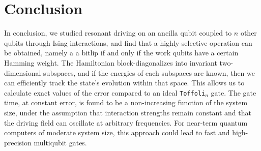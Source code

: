 \section{Conclusion}
In conclusion, we studied resonant driving on an ancilla qubit coupled to $n$ other qubits through Ising interactions, and find that a highly selective operation can be obtained, namely a a bitlip if and only if the work qubits have a certain Hamming weight. The Hamiltonian block-diagonalizes into invariant two-dimensional subspaces, and if the energies of each subspaces are known, then we can efficiently track the state's evolution within that space. This allows us to calculate exact values of the error compared to an ideal \texttt{Toffoli}$_n$ gate. The gate time, at constant error, is found to be a non-increasing function of the system size, under the assumption that interaction strengths remain constant and that the driving field can oscillate at arbitrary frequencies. For near-term quantum computers of moderate system size, this approach could lead to fast and high-precision multiqubit gates. 